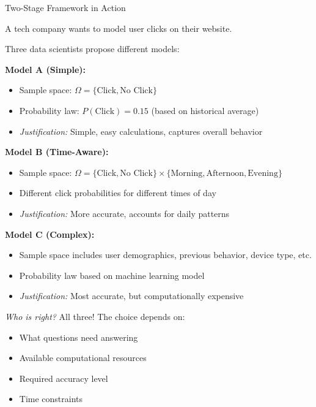 \begin{itemize}
\begin{exampleboxbreak}{Two-Stage Framework in Action}

 A tech company wants to model user clicks on their website.


Three data scientists propose different models:

\textbf{Model A (Simple):}
\begin{itemize}
    \item Sample space: $\Omega = \{\text{Click}, \text{No Click}\}$
    \item Probability law: $P(\text{Click}) = 0.15$ (based on historical average)
    \item \textit{Justification:} Simple, easy calculations, captures overall behavior
\end{itemize}

\textbf{Model B (Time-Aware):}
\begin{itemize}
    \item Sample space: $\Omega = \{\text{Click}, \text{No Click}\} \times \{\text{Morning}, \text{Afternoon}, \text{Evening}\}$
    \item Different click probabilities for different times of day
    \item \textit{Justification:} More accurate, accounts for daily patterns
\end{itemize}

\textbf{Model C (Complex):}
\begin{itemize}
    \item Sample space includes user demographics, previous behavior, device type, etc.
    \item Probability law based on machine learning model
    \item \textit{Justification:} Most accurate, but computationally expensive
\end{itemize}

\textit{Who is right?} All three! The choice depends on:
\begin{itemize}
    \item What questions need answering
    \item Available computational resources
    \item Required accuracy level
    \item Time constraints
\end{itemize}



\end{exampleboxbreak}
\end{itemize}
